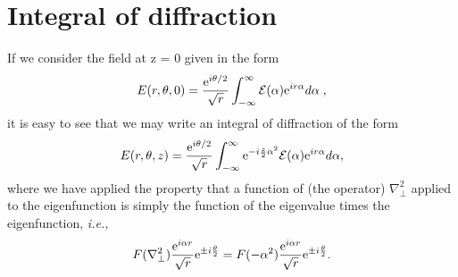 \documentclass[aps,pra,reprint,superscriptaddress]{revtex4-2}
\begin{document}
\section{Integral of diffraction}
If we consider the field at z = 0 given in the form
%
%
\begin{equation}\label{IntOfDiff}
    E(r,\theta,0)=\frac{\hbox{e}^{i\theta/2}}{\sqrt{r}}\int_{-\infty}^{\infty}\mathcal{E}(\alpha)\hbox{e}^{ir\alpha}d\alpha\;,
\end{equation}
%
%
it is easy to see that we may write an integral of diffraction of the form
%
%
\begin{equation}
    E(r,\theta,z)=\frac{\hbox{e}^{i\theta/2}}{\sqrt{r}}\int_{-\infty}^{\infty}\hbox{e}^{{\color{black}-}i\frac{z}{2}\alpha^2}\mathcal{E}(\alpha)\hbox{e}^{ir\alpha}d\alpha,
\end{equation}
%
%
where we have applied the property that a function of (the operator) $\nabla_{\perp}^2$ applied to the eigenfunction is simply the function of the eigenvalue times the eigenfunction, {\it i.e.,}
%
%
\begin{eqnarray}\label{0010}
  F(\nabla_{\perp}^2)\frac{\hbox{e}^{i\alpha r}}{\sqrt{r}}\hbox{e}^{\pm i\frac{\theta}{2}}=
  F(-\alpha^2) \frac{\hbox{e}^{i\alpha r}}{\sqrt{r}}\hbox{e}^{\pm i\frac{\theta}{2}}.
\end{eqnarray}
\end{document}
